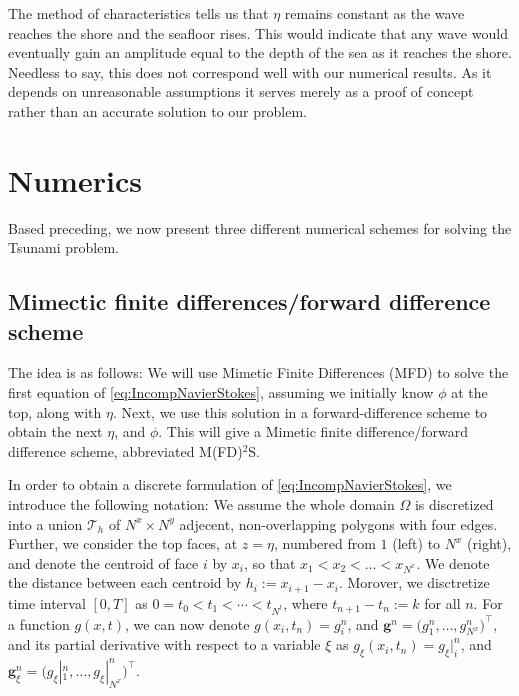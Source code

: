 \documentclass[11pt]{article}
\begin{document}
The method of characteristics tells us that $\eta$ remains constant as the wave reaches the shore and the seafloor rises. This would indicate that any wave would eventually gain an amplitude equal to the depth of the sea as it reaches the shore. Needless to say, this does not correspond well with our numerical results. As it depends on unreasonable assumptions it serves merely as a proof of concept rather than an accurate solution to our problem.


%
%


\section{Numerics}

Based preceding, we now present three different numerical schemes for solving the Tsunami problem.
%
%
\subsection{Mimectic finite differences/forward difference scheme}

The idea is as follows: We will use Mimetic Finite Differences (MFD) \cite{raynaud15} to solve the first equation of \eqref{eq:IncompNavierStokes}, assuming we initially know
$\phi$ at the top, along with $\eta$. Next, we use this solution in a forward-difference scheme to obtain the next $\eta$, and $\phi$. This will give a Mimetic finite
difference/forward difference scheme, abbreviated M(FD)$^2$S.

In order to obtain a discrete formulation of \eqref{eq:IncompNavierStokes}, we introduce the following notation:
We assume the whole domain $\Omega$ is discretized into a union $\mathcal{T}_h$ of $N^x \times N^y$ adjecent, non-overlapping
polygons with four edges. Further, we consider the top faces, at $z = \eta$, numbered from $1$ (left) to $N^x$ (right), and denote
the centroid of face $i$ by $x_i$, so that $x_1 < x_2 < \dots < x_{N^x}$. We denote the distance between each centroid by
$h_i := x_{i+1}-x_i$. Morover, we disctretize time interval $[0, T]$ as $0 = t_0 < t_1 < \cdots < t_{N^t}$, where $t_{n+1}-t_n := k$ for all $n$.
For a function $g(x,t)$, we can now denote $g(x_i, t_n) = g_i^n$, and $\bm{g}^n = \Big(g_1^n, \dots, g_{N^x}^n\Big)^\top$, and its partial derivative with respect
to a variable $\xi$ as $g_\xi(x_i, t_n) = g_{\xi}|_i^n$, and $\bm{g}_\xi^n = \Big(g_{\xi}|_1^n, \dots, g_{\xi}|_{N^x}^n\Big)^\top$.
\end{document}
